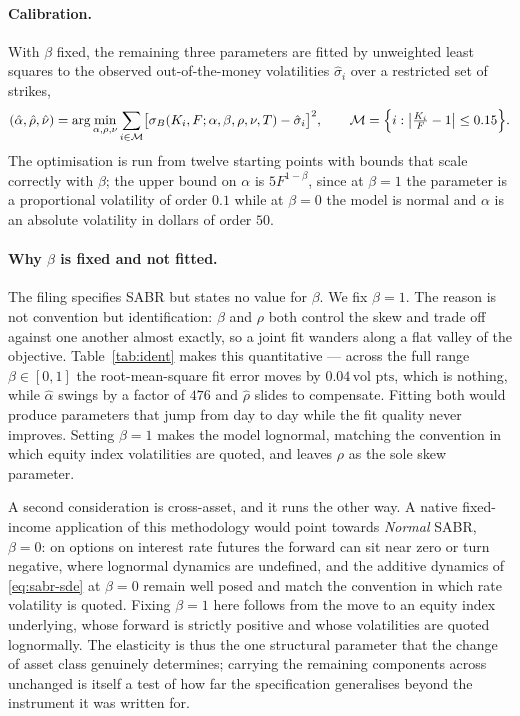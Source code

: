 \documentclass[11pt]{article}
\newcommand{\vp}{\,\text{vol pts}}
\begin{document}
\paragraph{Calibration.} With $\beta$ fixed, the remaining three parameters are fitted
by unweighted least squares to the observed out-of-the-money volatilities
$\hat{\sigma}_i$ over a restricted set of strikes,
\begin{equation}
  (\hat{\alpha},\hat{\rho},\hat{\nu})
  =\arg\min_{\alpha,\rho,\nu}
   \sum_{i\in\mathcal{M}}\bigl[\sigma_{B}(K_i,F;\alpha,\beta,\rho,\nu,T)-\hat{\sigma}_i\bigr]^{2},
  \qquad
  \mathcal{M}=\Bigl\{i:\bigl|\tfrac{K_i}{F}-1\bigr|\le 0.15\Bigr\}.
  \label{eq:objective}
\end{equation}
The optimisation is run from twelve starting points with bounds that scale correctly
with $\beta$; the upper bound on $\alpha$ is $5F^{1-\beta}$, since at $\beta=1$ the
parameter is a proportional volatility of order $0.1$ while at $\beta=0$ the model is
normal and $\alpha$ is an absolute volatility in dollars of order $50$.

\paragraph{Why $\beta$ is fixed and not fitted.} The filing specifies SABR but states no
value for $\beta$. We fix $\beta=1$. The reason is not convention but identification:
$\beta$ and $\rho$ both control the skew and trade off against one another almost
exactly, so a joint fit wanders along a flat valley of the objective. Table~\ref{tab:ident}
makes this quantitative --- across the full range $\beta\in[0,1]$ the root-mean-square
fit error moves by $0.04\vp$, which is nothing, while $\hat{\alpha}$ swings by a factor
of $476$ and $\hat{\rho}$ slides to compensate. Fitting both would produce parameters
that jump from day to day while the fit quality never improves. Setting $\beta=1$ makes
the model lognormal, matching the convention in which equity index volatilities are
quoted, and leaves $\rho$ as the sole skew parameter.

A second consideration is cross-asset, and it runs the other way. A native fixed-income
application of this methodology would point towards \emph{Normal} SABR, $\beta=0$: on
options on interest rate futures the forward can sit near zero or turn negative, where
lognormal dynamics are undefined, and the additive dynamics of \eqref{eq:sabr-sde} at
$\beta=0$ remain well posed and match the convention in which rate volatility is quoted.
Fixing $\beta=1$ here follows from the move to an equity index underlying, whose forward
is strictly positive and whose volatilities are quoted lognormally. The elasticity is
thus the one structural parameter that the change of asset class genuinely determines;
carrying the remaining components across unchanged is itself a test of how far the
specification generalises beyond the instrument it was written for.
\end{document}
